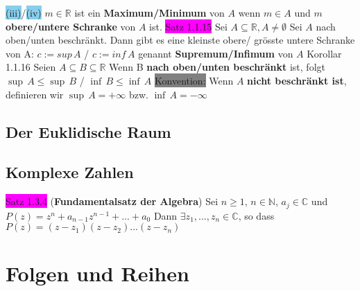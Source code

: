 \documentclass[landscape, 10pt]{article}
\newcommand{\R}{\mathbb{R}}
\newcommand{\N}{\mathbb{N}}
\newcommand{\C}{\mathbb{C}}
\begin{document}
\begin{multicols}{3}
         \colorbox{SkyBlue}{(iii)}/\colorbox{SkyBlue}{(iv)} $m\in\R$ ist ein 
                \textbf{Maximum/Minimum} von $A$ wenn $m\in A$ und 
                $m$ \textbf{obere/untere Schranke} von $A$ ist. 
\colorbox{magenta}{Satz 1.1.15}  Sei $A\subseteq\R, A\neq\emptyset$ Sei $A$ 
                nach oben/unten beschränkt. 
                Dann gibt es eine kleinste obere/ grösste 
         untere Schranke von A: \quad \textcolor{NavyBlue}{
                $c:=sup\,A$ / $c:=inf\,A$}  genannt 
                \textbf{Supremum/Infimum} von $A$ 
\colorbox{BurntOrange}{Korollar 1.1.16} Seien \textcolor{NavyBlue}{
                $A\subseteq B\subseteq\R$} Wenn B \textbf{nach oben/unten 
                beschränkt} ist, folgt \textcolor{NavyBlue}{
                $\sup\,A\leqslant \sup\,B$ / $\inf\,B\leqslant \inf\,A$} 
\colorbox{gray}{Konvention:} Wenn $A$ \textbf{nicht beschränkt ist}, definieren wir 
                 \textcolor{NavyBlue}{$\sup\,A=+\infty$} bzw. 
                 \textcolor{NavyBlue}{$\inf\,A=-\infty$}
\subsection{Der Euklidische Raum}
\subsection{Komplexe Zahlen}
\colorbox{magenta}{Satz 1.3.4} (\textbf{Fundamentalsatz der Algebra}) Sei 
                $n\geqslant 1,\,n\in\N,\,a_j\in\C$ und 
                \textcolor{NavyBlue}{$P(z)=z^n+a_{n-1}z^{n-1}+...+a_0$}
         Dann \textcolor{NavyBlue}{$\exists z_1,...,z_n\in\C$}, so dass 
                \textcolor{NavyBlue}{$P(z)=(z-z_1)(z-z_2)...(z-z_n)$}
\section{Folgen und Reihen}

\end{multicols}
\end{document}
